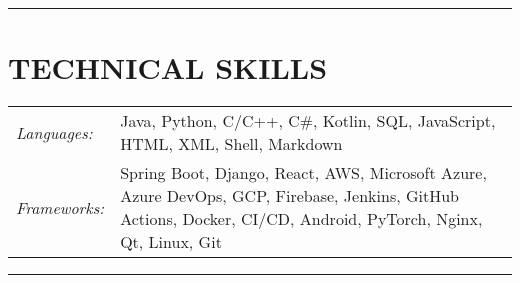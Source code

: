 \documentclass{res}
\begin{document}
\begin{resume}
\vspace{-8pt}
\hspace{-0.55in}
\noindent\rule[0.25\baselineskip]{19.36cm}{0.5pt}    
      
\vspace{-0.2in}
\section{TECHNICAL SKILLS}  
    \vspace{+0.1in}
    \hspace{-0.12in} 
    \begin{tabular}{l p{5.5in}}
    \rule{0in}{0.2in}
    {\sl Languages:} & Java, Python, C/C++, C\#, Kotlin, SQL, JavaScript, HTML, XML,  
                        Shell, Markdown \\ 
    \rule{0in}{0.2in}
    {\sl Frameworks:} & Spring Boot, Django, React, AWS, Microsoft Azure, Azure DevOps, GCP, Firebase, 
                        Jenkins, GitHub Actions, Docker, CI/CD, Android, PyTorch, Nginx, Qt, Linux, Git
    \end{tabular}   

\vspace{-2pt}
\hspace{-0.55in}
\noindent\rule[0.25\baselineskip]{19.36cm}{0.5pt}    

\vspace{-0.2in}

\end{resume}
\end{document}
